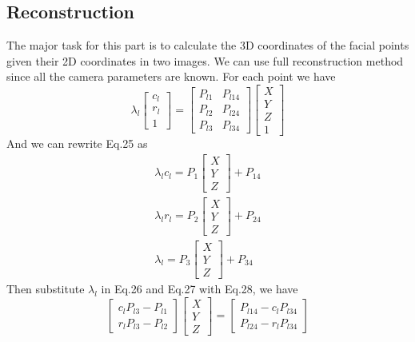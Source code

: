 \documentclass{article}
\begin{document}
\subsection*{Reconstruction}
\par
The major task for this part is to calculate the 3D coordinates of the facial points given their 2D coordinates in two images. We can use full reconstruction method since all the camera parameters are known. For each point we have
\begin{equation}
\lambda_l\begin{bmatrix}c_l\\r_l\\1\end{bmatrix}=\begin{bmatrix}P_{l1}&P_{l14}\\P_{l2}&P_{l24}\\P_{l3}&P_{l34}\end{bmatrix}\begin{bmatrix}X\\Y\\Z\\1\end{bmatrix}
\end{equation}
And we can rewrite Eq.25 as 
\begin{align}
\lambda_lc_l=P_1\begin{bmatrix}X\\Y\\Z\end{bmatrix}+P_{14}\\
\lambda_lr_l=P_2\begin{bmatrix}X\\Y\\Z\end{bmatrix}+P_{24}\\
\lambda_l=P_3\begin{bmatrix}X\\Y\\Z\end{bmatrix}+P_{34}
\end{align}
Then substitute $\lambda_l$ in Eq.26 and Eq.27 with Eq.28, we have
\begin{equation}
\begin{bmatrix}
c_lP_{l3}-P_{l1}\\r_lP_{l3}-P_{l2}
\end{bmatrix}\begin{bmatrix}
X\\Y\\Z
\end{bmatrix}=\begin{bmatrix}
P_{l14}-c_lP_{l34}\\P_{l24}-r_lP_{l34}
\end{bmatrix}
\end{equation}
\end{document}
